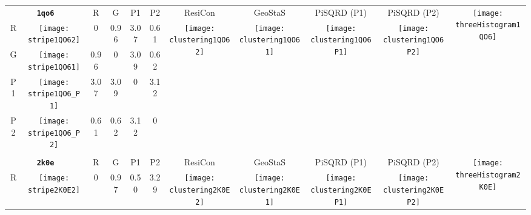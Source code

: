 \documentclass[a4paper,11pt,twoside]{book}%
\begin{document}
\begin{appendices}
\begin{sidewaystable}[h!]
\sffamily
\begin{tabular*}{4cm}{cc|c|c|c|c|c|c|c|c|c|}
\cline{1-11}
\multicolumn{2}{|c|}{{\bf \texttt{1qo6}}} & R & G & P1 & P2 & ResiCon & GeoStaS & PiSQRD (P1) & PiSQRD (P2) & \multirow{5}{*}{\vspace{-0.15cm}\texttt{[image: threeHistogram1QO6]}}  \\
\cline{1-10}
\multicolumn{1}{|c|}{R} & \texttt{[image: stripe1QO62]} & 0 & 0.96 & 3.07 & 0.61 & \multirow{4}{*}{\vspace{-0.3cm}\texttt{[image: clustering1QO62]}} & \multirow{4}{*}{\vspace{-0.3cm}\texttt{[image: clustering1QO61]}} & \multirow{4}{*}{\vspace{-0.3cm}\texttt{[image: clustering1QO6P1]}} & \multirow{4}{*}{\vspace{-0.3cm}\texttt{[image: clustering1QO6P2]}} &  \multirow{5}{*}{} \\
\cline{1-6}
\multicolumn{1}{|c|}{G} & \texttt{[image: stripe1QO61]} & 0.96 & 0 & 3.09 & 0.62 & \multirow{4}{*}{} & \multirow{4}{*}{} & \multirow{4}{*}{} & \multirow{4}{*}{} & \multirow{5}{*}{} \\
\cline{1-6}
\multicolumn{1}{|c|}{P1} & \texttt{[image: stripe1QO6\_P1]} & 3.07 & 3.09 & 0 & 3.12 & \multirow{4}{*}{} & \multirow{4}{*}{} & \multirow{4}{*}{} & \multirow{4}{*}{} & \multirow{5}{*}{}  \\
\cline{1-6}
\multicolumn{1}{|c|}{P2} & \texttt{[image: stripe1QO6\_P2]} & 0.61 & 0.62 & 3.12 & 0 & \multirow{4}{*}{} & \multirow{4}{*}{} & \multirow{4}{*}{} & \multirow{4}{*}{} & \multirow{5}{*}{}  \\
\cline{1-11}
\\
\cline{1-11}
\multicolumn{2}{|c|}{{\bf \texttt{2k0e}}} & R & G & P1 & P2 & ResiCon & GeoStaS & PiSQRD (P1) & PiSQRD (P2) & \multirow{5}{*}{\vspace{-0.15cm}\texttt{[image: threeHistogram2K0E]}}  \\
\cline{1-10}
\multicolumn{1}{|c|}{R} & \texttt{[image: stripe2K0E2]} & 0 & 0.97 & 0.50 & 3.29 & \multirow{4}{*}{\vspace{-0.3cm}\texttt{[image: clustering2K0E2]}} & \multirow{4}{*}{\vspace{-0.3cm}\texttt{[image: clustering2K0E1]}} & \multirow{4}{*}{\vspace{-0.3cm}\texttt{[image: clustering2K0EP1]}} & \multirow{4}{*}{\vspace{-0.3cm}\texttt{[image: clustering2K0EP2]}} &  \multirow{5}{*}{} \\

\end{tabular*}
\end{sidewaystable}
\end{appendices}
\end{document}

